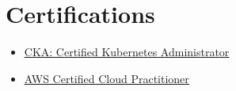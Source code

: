 \documentclass[a4paper,10pt]{article}
\makeatletter
\newcommand{\resumeItem}[1]{
  \item\small{#1}
}
\newcommand{\resumeItemListStart}{\begin{itemize}[rightmargin=0.11in]}
\newcommand{\resumeItemListEnd}{\end{itemize}}
\newcommand{\resumeTrioHeading}[3]{
  \item\small{
    \begin{tabular*}{0.96\textwidth}[t]{
      l@{\extracolsep{\fill}}c@{\extracolsep{\fill}}r
    }
      \textbf{#1} & \textit{#2} & #3
    \end{tabular*}
  }
}
\newcommand{\resumeHeadingListEnd}{\end{itemize}}
\newcommand{\hrefUline}[2]{
  \href{#1}{\uline{#2}}
}
\makeatother
\begin{document}



\section{Certifications}
  \resumeItemListStart{}
    \resumeItem{\hrefUline{https://www.credly.com/badges/24659e03-b038-41e8-9a85-9c10fbe525d5}{CKA: Certified Kubernetes Administrator}}
    \resumeItem{\hrefUline{https://www.credly.com/badges/968bad65-6464-49fb-b836-c53a0dd30daf}{AWS Certified Cloud Practitioner}}
  \resumeItemListEnd{}
\end{document}
